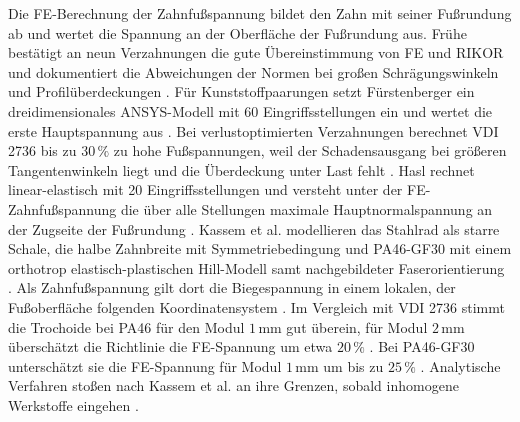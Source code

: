 Die FE-Berechnung der Zahnfußspannung bildet den Zahn mit seiner Fußrundung ab und wertet die Spannung an der Oberfläche der Fußrundung aus. Frühe bestätigt an neun Verzahnungen die gute Übereinstimmung von FE und RIKOR und dokumentiert die Abweichungen der Normen bei großen Schrägungswinkeln und Profilüberdeckungen \cite[S.~104]{Frue12}. Für Kunststoffpaarungen setzt Fürstenberger ein dreidimensionales ANSYS-Modell mit 60 Eingriffsstellungen ein und wertet die erste Hauptspannung aus \cite[S.~36 bis 37]{Fuer13}. Bei verlustoptimierten Verzahnungen berechnet VDI 2736 bis zu $30\,\%$ zu hohe Fußspannungen, weil der Schadensausgang bei größeren Tangentenwinkeln liegt und die Überdeckung unter Last fehlt \cite[S.~94 bis 95]{Fuer13}. Hasl rechnet linear-elastisch mit 20 Eingriffsstellungen und versteht unter der FE-Zahnfußspannung die über alle Stellungen maximale Hauptnormalspannung an der Zugseite der Fußrundung \cite[S.~29]{Has18}. Kassem et al. modellieren das Stahlrad als starre Schale, die halbe Zahnbreite mit Symmetriebedingung und PA46-GF30 mit einem orthotrop elastisch-plastischen Hill-Modell samt nachgebildeter Faserorientierung \cite[S.~6 bis 9]{Kas22}. Als Zahnfußspannung gilt dort die Biegespannung in einem lokalen, der Fußoberfläche folgenden Koordinatensystem \cite[S.~7]{Kas22}. Im Vergleich mit VDI 2736 stimmt die Trochoide bei PA46 für den Modul $1$\,mm gut überein, für Modul $2$\,mm überschätzt die Richtlinie die FE-Spannung um etwa $20\,\%$ \cite[S.~12]{Kas22}. Bei PA46-GF30 unterschätzt sie die FE-Spannung für Modul $1$\,mm um bis zu $25\,\%$ \cite[S.~14]{Kas22}. Analytische Verfahren stoßen nach Kassem et al. an ihre Grenzen, sobald inhomogene Werkstoffe eingehen \cite[S.~17]{Kas22}.

